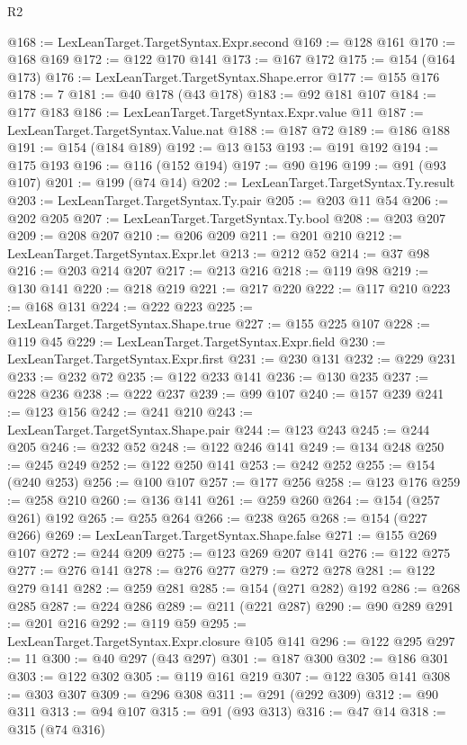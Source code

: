 \begin{lexlean}{R2}
\begin{coremodule}
@168 := LexLeanTarget.TargetSyntax.Expr.second
@169 := @128 @161
@170 := @168 @169
@172 := @122 @170 @141
@173 := @167 @172
@175 := @154 (@164 @173)
@176 := LexLeanTarget.TargetSyntax.Shape.error
@177 := @155 @176
@178 := 7
@181 := @40 @178 (@43 @178)
@183 := @92 @181 @107
@184 := @177 @183
@186 := LexLeanTarget.TargetSyntax.Expr.value @11
@187 := LexLeanTarget.TargetSyntax.Value.nat
@188 := @187 @72
@189 := @186 @188
@191 := @154 (@184 @189)
@192 := @13 @153
@193 := @191 @192
@194 := @175 @193
@196 := @116 (@152 @194)
@197 := @90 @196
@199 := @91 (@93 @107)
@201 := @199 (@74 @14)
@202 := LexLeanTarget.TargetSyntax.Ty.result
@203 := LexLeanTarget.TargetSyntax.Ty.pair
@205 := @203 @11 @54
@206 := @202 @205
@207 := LexLeanTarget.TargetSyntax.Ty.bool
@208 := @203 @207
@209 := @208 @207
@210 := @206 @209
@211 := @201 @210
@212 := LexLeanTarget.TargetSyntax.Expr.let
@213 := @212 @52
@214 := @37 @98
@216 := @203 @214 @207
@217 := @213 @216
@218 := @119 @98
@219 := @130 @141
@220 := @218 @219
@221 := @217 @220
@222 := @117 @210
@223 := @168 @131
@224 := @222 @223
@225 := LexLeanTarget.TargetSyntax.Shape.true
@227 := @155 @225 @107
@228 := @119 @45
@229 := LexLeanTarget.TargetSyntax.Expr.field
@230 := LexLeanTarget.TargetSyntax.Expr.first
@231 := @230 @131
@232 := @229 @231
@233 := @232 @72
@235 := @122 @233 @141
@236 := @130 @235
@237 := @228 @236
@238 := @222 @237
@239 := @99 @107
@240 := @157 @239
@241 := @123 @156
@242 := @241 @210
@243 := LexLeanTarget.TargetSyntax.Shape.pair
@244 := @123 @243
@245 := @244 @205
@246 := @232 @52
@248 := @122 @246 @141
@249 := @134 @248
@250 := @245 @249
@252 := @122 @250 @141
@253 := @242 @252
@255 := @154 (@240 @253)
@256 := @100 @107
@257 := @177 @256
@258 := @123 @176
@259 := @258 @210
@260 := @136 @141
@261 := @259 @260
@264 := @154 (@257 @261) @192
@265 := @255 @264
@266 := @238 @265
@268 := @154 (@227 @266)
@269 := LexLeanTarget.TargetSyntax.Shape.false
@271 := @155 @269 @107
@272 := @244 @209
@275 := @123 @269 @207 @141
@276 := @122 @275
@277 := @276 @141
@278 := @276 @277
@279 := @272 @278
@281 := @122 @279 @141
@282 := @259 @281
@285 := @154 (@271 @282) @192
@286 := @268 @285
@287 := @224 @286
@289 := @211 (@221 @287)
@290 := @90 @289
@291 := @201 @216
@292 := @119 @59
@295 := LexLeanTarget.TargetSyntax.Expr.closure @105 @141
@296 := @122 @295
@297 := 11
@300 := @40 @297 (@43 @297)
@301 := @187 @300
@302 := @186 @301
@303 := @122 @302
@305 := @119 @161 @219
@307 := @122 @305 @141
@308 := @303 @307
@309 := @296 @308
@311 := @291 (@292 @309)
@312 := @90 @311
@313 := @94 @107
@315 := @91 (@93 @313)
@316 := @47 @14
@318 := @315 (@74 @316)

\end{coremodule}
\end{lexlean}
